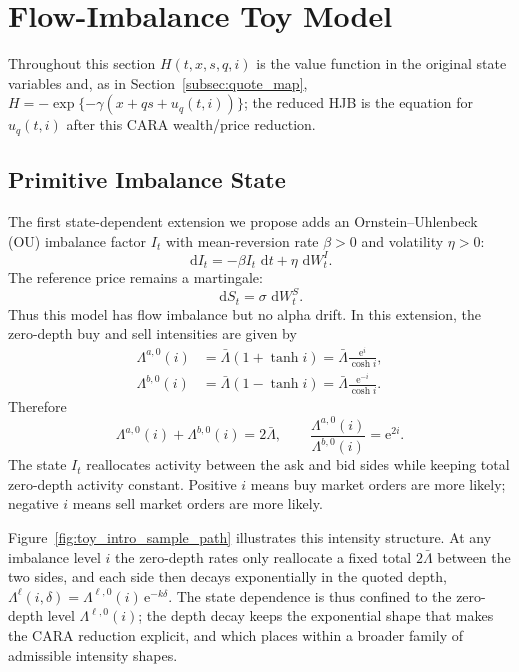 \documentclass[11pt,a4paper]{article}
\newcommand{\dd}{\,\mathrm{d}}
\newcommand{\e}{\mathrm e}
\theoremstyle{plain}
\theoremstyle{definition}
\begin{document}

\section{Flow-Imbalance Toy Model}
\label{sec:toy}

Throughout this section \(H(t,x,s,q,i)\) is the value function in the original
state variables and, as in Section~\ref{subsec:quote_map},
\(H=-\exp\{-\gamma(x+qs+u_q(t,i))\}\); the reduced HJB is the equation for
\(u_q(t,i)\) after this CARA wealth/price reduction.

\subsection{Primitive Imbalance State}

The first state-dependent extension we propose adds an
Ornstein--Uhlenbeck (OU) imbalance factor \(I_t\) with mean-reversion rate
\(\beta>0\) and volatility \(\eta>0\):
\begin{equation}
\dd I_t=-\beta I_t\,\dd t+\eta\,\dd W^I_t.
\label{eq:toy_ou}
\end{equation}
The reference price remains a martingale:
\[
\dd S_t=\sigma\,\dd W^S_t.
\]
Thus this model has flow imbalance but no alpha drift.
In this extension, the zero-depth buy and sell intensities are given by
\begin{align}
\Lambda^{a,0}(i)
&=\bar\Lambda(1+\tanh i)
=\bar\Lambda\frac{\e^i}{\cosh i},
\label{eq:lambda_ask}\\
\Lambda^{b,0}(i)
&=\bar\Lambda(1-\tanh i)
=\bar\Lambda\frac{\e^{-i}}{\cosh i}.
\label{eq:lambda_bid}
\end{align}
Therefore
\[
\Lambda^{a,0}(i)+\Lambda^{b,0}(i)=2\bar\Lambda,
\qquad
\frac{\Lambda^{a,0}(i)}{\Lambda^{b,0}(i)}=\e^{2i}.
\]
The state \(I_t\) reallocates activity between the ask and bid sides while
keeping total zero-depth activity constant.  Positive \(i\) means buy market
orders are more likely; negative \(i\) means sell market orders are more
likely.

Figure~\ref{fig:toy_intro_sample_path} illustrates this intensity structure.  At any imbalance level \(i\) the
zero-depth rates only reallocate a fixed total \(2\bar\Lambda\) between the two
sides, and each side then decays exponentially in the quoted depth,
\(\Lambda^\ell(i,\delta)=\Lambda^{\ell,0}(i)\,\e^{-k\delta}\).  The state
dependence is thus confined to the zero-depth level \(\Lambda^{\ell,0}(i)\);
the depth decay keeps the exponential shape that makes the CARA reduction
explicit, and which \cite{GueantLehalle2015} places within a broader family of
admissible intensity shapes.
\end{document}
